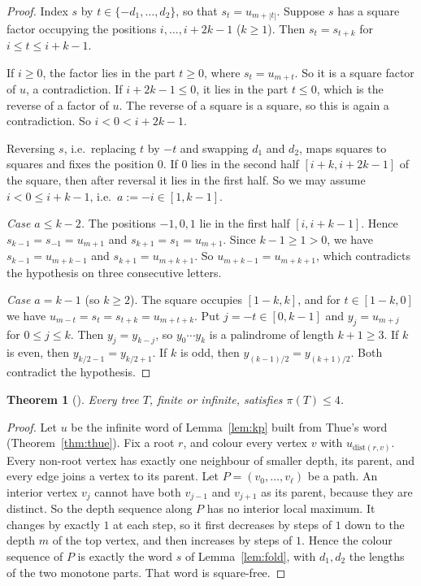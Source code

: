 \documentclass[11pt]{article}
\newtheorem{theorem}{Theorem}
\theoremstyle{definition}
\theoremstyle{remark}
\begin{document}
\begin{proof}
Index $s$ by $t\in\{-d_1,\dots,d_2\}$, so that $s_t=u_{m+|t|}$. Suppose $s$ has a square factor
occupying the positions $i,\dots,i+2k-1$ ($k\ge1$). Then $s_t=s_{t+k}$ for $i\le t\le i+k-1$.

If $i\ge0$, the factor lies in the part $t\ge0$, where $s_t=u_{m+t}$. So it is a square factor of
$u$, a contradiction. If $i+2k-1\le0$, it lies in the part $t\le0$, which is the reverse of a
factor of $u$. The reverse of a square is a square, so this is again a contradiction. So
$i<0<i+2k-1$.

Reversing $s$, i.e.\ replacing $t$ by $-t$ and swapping $d_1$ and $d_2$, maps squares to squares
and fixes the position $0$. If $0$ lies in the second half $[i+k,i+2k-1]$ of the square, then
after reversal it lies in the first half. So we may assume $i<0\le i+k-1$, i.e.\
$a:=-i\in[1,k-1]$.

\emph{Case $a\le k-2$.} The positions $-1,0,1$ lie in the first half $[i,i+k-1]$. Hence
$s_{k-1}=s_{-1}=u_{m+1}$ and $s_{k+1}=s_{1}=u_{m+1}$. Since $k-1\ge1>0$, we have
$s_{k-1}=u_{m+k-1}$ and $s_{k+1}=u_{m+k+1}$. So $u_{m+k-1}=u_{m+k+1}$, which contradicts the
hypothesis on three consecutive letters.

\emph{Case $a=k-1$} (so $k\ge2$). The square occupies $[1-k,k]$, and for $t\in[1-k,0]$ we have
$u_{m-t}=s_t=s_{t+k}=u_{m+t+k}$. Put $j=-t\in[0,k-1]$ and $y_j=u_{m+j}$ for $0\le j\le k$. Then
$y_j=y_{k-j}$, so $y_0\cdots y_k$ is a palindrome of length $k+1\ge3$. If $k$ is even, then
$y_{k/2-1}=y_{k/2+1}$. If $k$ is odd, then $y_{(k-1)/2}=y_{(k+1)/2}$. Both contradict the
hypothesis.
\end{proof}

\begin{theorem}[\cite{BGKNP}]\label{thm:four}
Every tree $T$, finite or infinite, satisfies $\pi(T)\le4$.
\end{theorem}

\begin{proof}
Let $u$ be the infinite word of Lemma~\ref{lem:kp} built from Thue's word
(Theorem~\ref{thm:thue}). Fix a root $r$, and colour every vertex $v$ with $u_{\mathrm{dist}(r,v)}$.
Every non-root vertex has exactly one neighbour of smaller depth, its parent, and every edge joins
a vertex to its parent. Let $P=(v_0,\dots,v_\ell)$ be a path. An interior vertex $v_j$ cannot have
both $v_{j-1}$ and $v_{j+1}$ as its parent, because they are distinct. So the depth sequence along
$P$ has no interior local maximum. It changes by exactly $1$ at each step, so it first decreases
by steps of $1$ down to the depth $m$ of the top vertex, and then increases by steps of $1$. Hence
the colour sequence of $P$ is exactly the word $s$ of Lemma~\ref{lem:fold}, with $d_1,d_2$ the
lengths of the two monotone parts. That word is square-free.
\end{proof}
\end{document}
